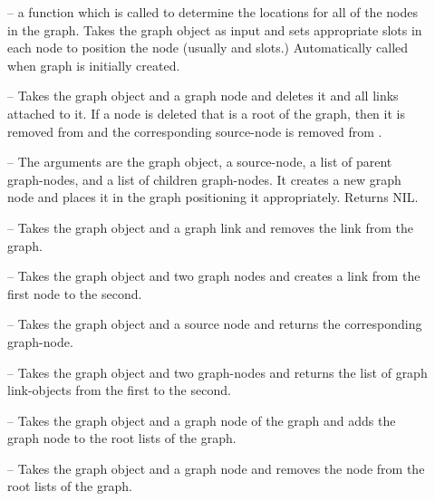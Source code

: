         \begin{description}
\item[]                  -- a function which is called to determine
                the locations for all of the nodes in the graph.  Takes
                the graph object as input and sets appropriate slots in
each node to position the node (usually  and  slots.)
Automatically called when graph is initially created.

\item[]                  -- Takes the graph object and a graph node
and deletes it and all links attached to it.  If a node is deleted that
is a root of the graph, then it is removed from  and the
corresponding source-node is removed from .

\item[]                  -- The arguments are the graph object, a
                source-node, a list of
                parent graph-nodes, and a list of children
                graph-nodes.  It creates a new graph node and places
                it in the graph positioning it appropriately.  Returns NIL.

\item[]                  -- Takes the graph object and a graph link
and removes the link from the graph.

\item[]                  -- Takes the graph object and two graph nodes
and creates a link from the first node to the second.

\item[]                  -- Takes the graph object and a
source node and returns the corresponding graph-node.

\item[]                  -- Takes the graph object and two graph-nodes
and returns the list of
                graph link-objects from the first to the second.

\item[]  -- Takes the graph object and a graph node of the graph and
adds the graph node to the root lists of the graph.

\item[]  -- Takes the graph object and a graph node and removes the
node from the root lists of the graph.


\end{description}
